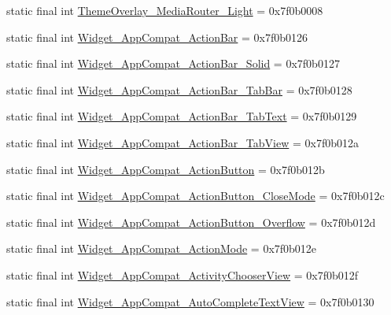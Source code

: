 \begin{CompactItemize}
\item 
static final int \hyperlink{classandroid_1_1support_1_1mediacompat_1_1_r_1_1style_1ec9eeaf69ec13fa068348b1234bb218}{ThemeOverlay\_\-MediaRouter\_\-Light} = 0x7f0b0008
\item 
static final int \hyperlink{classandroid_1_1support_1_1mediacompat_1_1_r_1_1style_bdb08567d82ce44b1511a5cb41646480}{Widget\_\-AppCompat\_\-ActionBar} = 0x7f0b0126
\item 
static final int \hyperlink{classandroid_1_1support_1_1mediacompat_1_1_r_1_1style_1a5dd6b8e05e1e187042532c92d05a95}{Widget\_\-AppCompat\_\-ActionBar\_\-Solid} = 0x7f0b0127
\item 
static final int \hyperlink{classandroid_1_1support_1_1mediacompat_1_1_r_1_1style_fe71223b9120e7d392634885df62d4e3}{Widget\_\-AppCompat\_\-ActionBar\_\-TabBar} = 0x7f0b0128
\item 
static final int \hyperlink{classandroid_1_1support_1_1mediacompat_1_1_r_1_1style_6f7bd26a45a6c6269b4d668d4722b5d3}{Widget\_\-AppCompat\_\-ActionBar\_\-TabText} = 0x7f0b0129
\item 
static final int \hyperlink{classandroid_1_1support_1_1mediacompat_1_1_r_1_1style_ffaf8544fdf09680497346877be6515e}{Widget\_\-AppCompat\_\-ActionBar\_\-TabView} = 0x7f0b012a
\item 
static final int \hyperlink{classandroid_1_1support_1_1mediacompat_1_1_r_1_1style_6b1e6eeeed8469724ecf871f44670b95}{Widget\_\-AppCompat\_\-ActionButton} = 0x7f0b012b
\item 
static final int \hyperlink{classandroid_1_1support_1_1mediacompat_1_1_r_1_1style_b34b20686d9f1686ce7288056b9d2156}{Widget\_\-AppCompat\_\-ActionButton\_\-CloseMode} = 0x7f0b012c
\item 
static final int \hyperlink{classandroid_1_1support_1_1mediacompat_1_1_r_1_1style_56e0624dd22b2cbd9ad1e71bf2645665}{Widget\_\-AppCompat\_\-ActionButton\_\-Overflow} = 0x7f0b012d
\item 
static final int \hyperlink{classandroid_1_1support_1_1mediacompat_1_1_r_1_1style_2029c208e535dd85703869a6779ae37d}{Widget\_\-AppCompat\_\-ActionMode} = 0x7f0b012e
\item 
static final int \hyperlink{classandroid_1_1support_1_1mediacompat_1_1_r_1_1style_e4dc56ecefee1475f8b932c95e7f7405}{Widget\_\-AppCompat\_\-ActivityChooserView} = 0x7f0b012f
\item 
static final int \hyperlink{classandroid_1_1support_1_1mediacompat_1_1_r_1_1style_c619ca07bae4843869d0660d9653ef9e}{Widget\_\-AppCompat\_\-AutoCompleteTextView} = 0x7f0b0130

\end{CompactItemize}
